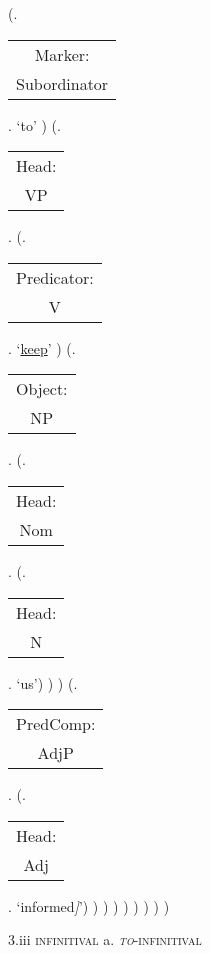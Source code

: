 \documentclass[12pt,letterpaper]{article}
\begin{document}
\begin{figure}
\begin{center}
\begin{parsetree}
			(.\begin{tabular}{c}Marker:\\Subordinator\end{tabular}.    `to' )
			(.\begin{tabular}{c}Head:\\VP\end{tabular}.
			(.\begin{tabular}{c}Predicator:\\V\end{tabular}.    `\underline{keep}' )
			(.\begin{tabular}{c}Object:\\NP\end{tabular}.  
			(.\begin{tabular}{c}Head:\\Nom\end{tabular}.
			(.\begin{tabular}{c}Head:\\N\end{tabular}. `us')
			)
			)
			(.\begin{tabular}{c}PredComp:\\AdjP\end{tabular}.  
			(.\begin{tabular}{c}Head:\\Adj\end{tabular}. `informed\emph{]}')
			)
			)
			)
			)
			)
			)
			)
			)
			
		\end{parsetree}
		\hfill \break \hfill \break
		3.iii \textsc{infinitival} a.  \textsc{\textit{to}-infinitival}
	\end{center}
\end{figure}
\end{document}
